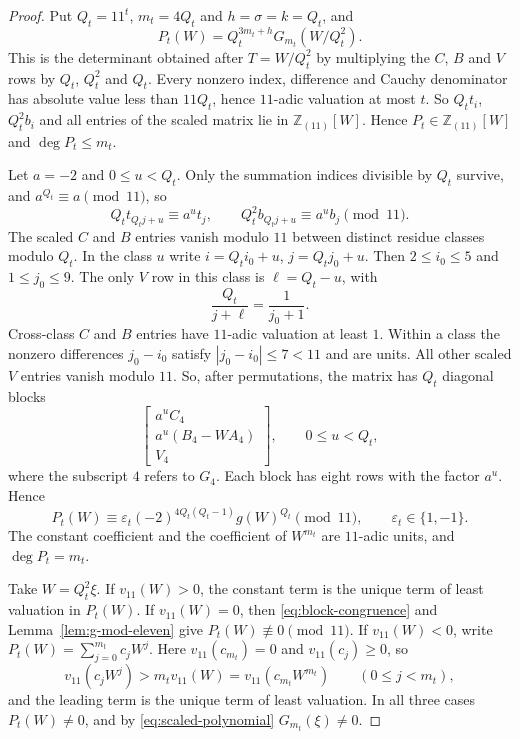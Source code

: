 \documentclass{amsart}
\numberwithin{equation}{section}
\numberwithin{table}{section}
\newcommand{\Z}{\mathbb{Z}}
\begin{document}
\begin{proof}
Put $Q_t=11^t$, $m_t=4Q_t$ and $h=\sigma=k=Q_t$, and
\begin{equation}\label{eq:scaled-polynomial}
P_t(W)=Q_t^{3m_t+h}G_{m_t}(W/Q_t^2).
\end{equation}
This is the determinant obtained after $T=W/Q_t^2$ by multiplying the $C$,
$B$ and $V$ rows by $Q_t$, $Q_t^2$ and $Q_t$. Every nonzero index,
difference and Cauchy denominator has absolute value less than $11Q_t$,
hence $11$-adic valuation at most $t$. So $Q_tt_i$, $Q_t^2b_i$ and all
entries of the scaled matrix lie in $\Z_{(11)}[W]$. Hence
$P_t\in\Z_{(11)}[W]$ and $\deg P_t\le m_t$.

Let $a=-2$ and $0\le u<Q_t$. Only the summation indices divisible by $Q_t$
survive, and $a^{Q_t}\equiv a\pmod{11}$, so
\begin{equation*}
Q_t t_{Q_t j+u}\equiv a^ut_j,
\qquad Q_t^2b_{Q_t j+u}\equiv a^ub_j\pmod {11}.
\end{equation*}
The scaled $C$ and $B$ entries vanish modulo $11$ between distinct residue
classes modulo $Q_t$. In the class $u$ write $i=Q_t i_0+u$, $j=Q_t j_0+u$. Then
$2\le i_0\le5$ and $1\le j_0\le9$. The only $V$ row in this class is
$\ell=Q_t-u$, with
\[
\frac{Q_t}{j+\ell}=\frac{1}{j_0+1}.
\]
Cross-class $C$ and $B$ entries have $11$-adic valuation at least $1$.
Within a class the nonzero differences $j_0-i_0$ satisfy $|j_0-i_0|\le7<11$
and are units. All other scaled $V$ entries vanish modulo $11$. So, after permutations,
the matrix has $Q_t$ diagonal blocks
\[
\begin{bmatrix}
a^u C_4\\ a^u(B_4-WA_4)\\ V_4
\end{bmatrix},\qquad 0\le u<Q_t,
\]
where the subscript $4$ refers to $G_4$. Each block has eight rows with the
factor $a^u$. Hence
\begin{equation}\label{eq:block-congruence}
P_t(W)\equiv\varepsilon_t(-2)^{4Q_t(Q_t-1)}g(W)^{Q_t}\pmod {11},
\qquad \varepsilon_t\in\{1,-1\}.
\end{equation}
The constant coefficient and the coefficient of $W^{m_t}$ are $11$-adic
units, and $\deg P_t=m_t$.

Take $W=Q_t^2\xi$. If $v_{11}(W)>0$, the constant term is the unique term
of least valuation in $P_t(W)$. If $v_{11}(W)=0$, then
\eqref{eq:block-congruence} and Lemma~\ref{lem:g-mod-eleven} give
$P_t(W)\not\equiv0\pmod {11}$. If $v_{11}(W)<0$, write
$P_t(W)=\sum_{j=0}^{m_t}c_jW^j$. Here $v_{11}(c_{m_t})=0$ and
$v_{11}(c_j)\ge0$, so
\[
v_{11}(c_jW^j)>m_t v_{11}(W)=v_{11}(c_{m_t}W^{m_t})
\qquad(0\le j<m_t),
\]
and the leading term is the unique term of least valuation. In all three
cases $P_t(W)\ne0$, and by \eqref{eq:scaled-polynomial}
$G_{m_t}(\xi)\ne0$.
\end{proof}
\end{document}
